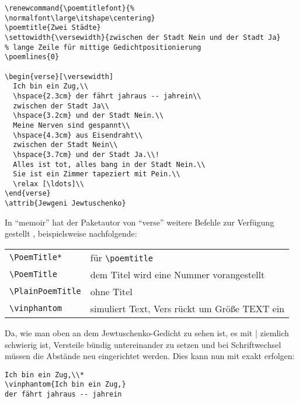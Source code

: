 \begin{lstlisting}
\renewcommand{\poemtitlefont}{%
\normalfont\large\itshape\centering}
\poemtitle{Zwei Städte}
\settowidth{\versewidth}{zwischen der Stadt Nein und der Stadt Ja}
% lange Zeile für mittige Gedichtpositionierung
\poemlines{0}   

\begin{verse}[\versewidth]
  Ich bin ein Zug,\\
  \hspace{2.3cm} der fährt jahraus -- jahrein\\
  zwischen der Stadt Ja\\
  \hspace{3.2cm} und der Stadt Nein.\\
  Meine Nerven sind gespannt\\
  \hspace{4.3cm} aus Eisendraht\\
  zwischen der Stadt Nein\\
  \hspace{3.7cm} und der Stadt Ja.\\!
  Alles ist tot, alles bang in der Stadt Nein.\\
  Sie ist ein Zimmer tapeziert mit Pein.\\
  \relax [\ldots]\\
\end{verse}
\attrib{Jewgeni Jewtuschenko}
\end{lstlisting}


In "`memoir"' hat der Paketautor von "`verse"' weitere Befehle
zur Verfügung gestellt \cite[Kap.\,14]{wilson:memoir}, beispielsweise nachfolgende:

\begin{tabular}{ll}
 \verb|\PoemTitle*| & für  \verb|\poemtitle|\\
 \verb|\PoemTitle|  & dem Titel wird eine Nummer vorangestellt\\
 \verb|\PlainPoemTitle| & ohne Titel \\
\verb|\vinphantom| & simuliert Text, Vers rückt um Größe TEXT ein \\
\end{tabular}

Da, wie man oben an dem Jewtuschenko-Gedicht zu sehen ist, es mit 
| ziemlich schwierig ist, Versteile bündig untereinander 
zu setzen und bei Schriftwechsel müssen die Abstände neu eingerichtet werden. Dies
kann nun 
mit  exakt erfolgen:

\begin{lstlisting}
Ich bin ein Zug,\\*
\vinphantom{Ich bin ein Zug,}
der fährt jahraus -- jahrein
\end{lstlisting}

